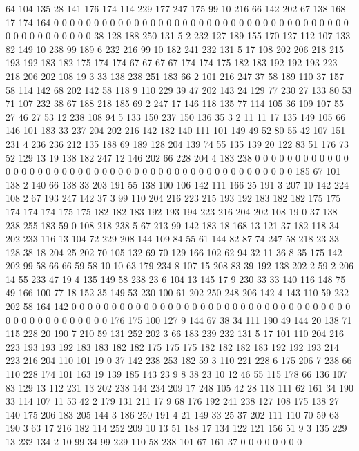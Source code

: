 64 104 135 28 141 176 174 114 229 177 247 175 99 10 216 66 142 202 67 138
168 17 174 164 0 0 0 0 0 0 0 0 0 0 0 0 0 0 0 0
0 0 0 0 0 0 0 0 0 0 0 0 0 0 0 0 0 0 0 0
0 0 0 0 0 0 0 0 0 0 0 0 38 128 188 250 131 5 2 232
127 189 155 170 127 112 107 133 82 149 10 238 99 189 6 232 216 99 10 182
241 232 131 5 17 108 202 206 218 215 193 192 183 182 175 174 174 67 67 67
67 174 174 175 182 183 192 192 193 223 218 206 202 108 19 3 33 138 238 251
183 66 2 101 216 247 37 58 189 110 37 157 58 114 142 68 202 142 58 118
9 110 229 39 47 202 143 24 129 77 230 27 133 80 53 71 107 232 38 67
188 218 185 69 2 247 17 146 118 135 77 114 105 36 109 107 55 27 46 27
53 12 238 108 94 5 133 150 237 150 136 35 3 2 11 11 17 135 149 105
66 146 101 183 33 237 204 202 216 142 182 140 111 101 149 49 52 80 55 42
107 151 231 4 236 236 212 135 188 69 189 128 204 139 74 55 135 139 20 122
83 51 176 73 52 129 13 19 138 182 247 12 146 202 66 228 204 4 183 238
0 0 0 0 0 0 0 0 0 0 0 0 0 0 0 0 0 0 0 0
0 0 0 0 0 0 0 0 0 0 0 0 0 0 0 0 0 0 0 0
0 0 0 0 0 0 0 0 185 67 101 138 2 140 66 138 33 203 191 55
138 100 106 142 111 166 25 191 3 207 10 142 224 108 2 67 193 247 142 37
3 99 110 204 216 223 215 193 192 183 182 182 175 175 174 174 174 175 175 182
182 183 192 193 194 223 216 204 202 108 19 0 37 138 238 255 183 59 0 108
218 238 5 67 213 99 142 183 18 168 13 121 37 182 118 34 202 233 116 13
104 72 229 208 144 109 84 55 61 144 82 87 74 247 58 218 23 33 128 38
18 204 25 202 70 105 132 69 70 129 166 102 62 94 32 11 36 8 35 175
142 202 99 58 66 66 59 58 10 10 63 179 234 8 107 15 208 83 39 192
138 202 2 59 2 206 14 55 233 47 19 4 135 149 58 238 23 6 104 13
145 17 9 230 33 33 140 116 148 75 49 166 100 77 18 152 35 149 53 230
100 61 202 250 248 206 142 4 143 110 59 232 202 58 164 142 0 0 0 0
0 0 0 0 0 0 0 0 0 0 0 0 0 0 0 0 0 0 0 0
0 0 0 0 0 0 0 0 0 0 0 0 0 0 0 0 0 0 0 0
0 0 0 0 176 175 100 127 9 144 67 38 34 111 190 49 144 20 138 71
115 228 20 190 7 210 59 131 252 202 3 66 183 239 232 131 5 17 101 110
204 216 223 193 193 192 183 183 182 182 175 175 175 182 182 182 183 192 192 193
214 223 216 204 110 101 19 0 37 142 238 253 182 59 3 110 221 228 6 175
206 7 238 66 110 228 174 101 163 19 139 185 143 23 9 8 38 23 10 12
46 55 115 178 66 136 107 83 129 13 112 231 13 202 238 144 234 209 17 248
105 42 28 118 111 62 161 34 190 33 114 107 11 53 42 2 179 131 211 17
9 68 176 192 241 238 127 108 175 138 27 140 175 206 183 205 144 3 186 250
191 4 21 149 33 25 37 202 111 110 70 59 63 190 3 63 17 216 182 114
252 209 10 13 51 188 17 134 122 121 156 51 9 3 135 229 13 232 134 2
10 99 34 99 229 110 58 238 101 67 161 37 0 0 0 0 0 0 0 0
